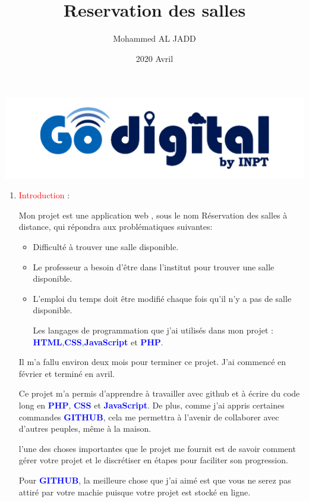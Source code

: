 \documentclass{article}
\title{Reservation des salles}
\author{Mohammed AL JADD}
\date{2020 Avril}
\begin{document}
\maketitle

    



\includegraphics[width=\textwidth]{img/Go.png}

\begin{enumerate}
    
     \item  \textcolor{red}{\huge Introduction} : 
     \vspace{1cm}
 
   \setlength{\parindent}{1cm} Mon projet est une application web , sous le nom Réservation des salles à distance, qui répondra aux problématiques suivantes:
   \begin{itemize}
     
        \item Difficulté à trouver une salle disponible.
        \item Le professeur a besoin d'être dans l'institut pour trouver une salle disponible.
        \item L'emploi du temps doit être modifié chaque fois qu'il n'y a pas de salle disponible.
        
            Les langages de programmation que j'ai utilisés dans mon projet : \textcolor{blue}{ \textbf{HTML}},\textcolor{blue}{\textbf{CSS}},\textcolor{blue}{\textbf{JavaScript}} et \textcolor{blue}{\textbf{PHP}}.
   \end{itemize}
   
   Il m'a fallu environ deux mois pour terminer ce projet. J'ai commencé en février et terminé en avril.\par Ce projet m'a permis d'apprendre à travailler avec github et à écrire du code long en \textcolor{blue}{\textbf{PHP}}, \textcolor{blue}{\textbf{CSS}} et \textcolor{blue}{\textbf{JavaScript}}. De plus, comme j'ai appris certaines commandes \textcolor{blue}{\textbf{GITHUB}}, cela me permettra à l'avenir de collaborer avec d'autres peuples, même à la maison.\par l'une des choses importantes que le projet me fournit est de savoir comment gérer votre projet et le discrétiser en étapes pour faciliter son progression.\par Pour \textcolor{blue}{\textbf{GITHUB}}, la meilleure chose que j'ai aimé est que vous ne serez pas attiré par votre machie puisque votre projet est stocké en ligne.
   

\end{enumerate}
\end{document}
